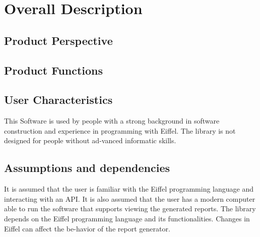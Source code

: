 \section{Overall Description}
\subsection{Product Perspective}
\subsection{Product Functions}
\subsection{User Characteristics}This Software is used by people with a strong background in software construction and experience in programming with Eiffel. The library is not designed for people without ad-vanced informatic skills.
\subsection{Assumptions and dependencies}
It is assumed that the user is familiar with the Eiffel programming language and interacting with an API. It is also assumed that the user has a modern computer able to run the software that supports viewing the generated reports. The library depends on the Eiffel programming language and its functionalities. Changes in Eiffel can affect the be-havior of the report generator.
